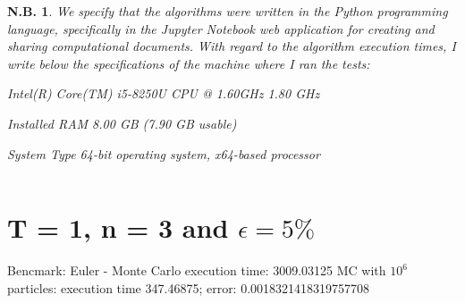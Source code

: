\documentclass[a4paper,11pt,openright]{report}
\newtheorem{notabene}[teo]{N.B.}
\begin{document}
\begin{notabene}
We specify that the algorithms were written in the Python programming language, specifically in the Jupyter Notebook web application for creating and sharing computational documents. With regard to the algorithm execution times, I write below the specifications of the machine where I ran the tests:

Intel(R) Core(TM) i5-8250U CPU @ 1.60GHz 1.80 GHz 

Installed RAM 8.00 GB (7.90 GB usable) 


System Type 64-bit operating system, x64-based processor
\end{notabene}
\[
\]
\newpage
\section{T = 1, n = 3 and $\epsilon = 5\%$}
Bencmark: Euler - Monte Carlo execution time:  3009.03125
MC with $10^6$ particles: execution time 347.46875; error:  0.0018321418319757708
\end{document}
